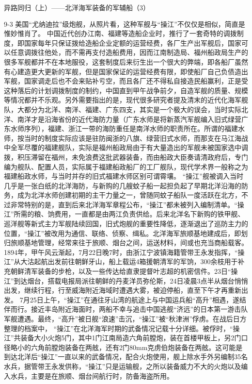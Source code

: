 \documentclass[12pt,UTF8]{ctexbook}
\begin{document}
异路同归（上）——北洋海军装备的军辅船（3）

9-3
美国“尤纳迪拉”级炮舰，从照片看，这种军舰与“操江”不仅仅是相似，简直是惟妙惟肖了。
中国近代创办江南、福建等造船企业时，推行了一套奇特的调拨制度，即国家每年只保证拨给造船企业定额的运营经费，各厂生产出军舰后，国家可以任意调拨往他处，而不需再支付造船费用，因而江南制造局、福州船政局生产的很多军舰都并不在本地服役，这套制度后来衍生出一个很大的弊端，即各船厂虽然有心建造更大更新的军舰，但是国家保证的运营经费有限，即使船厂自己负债造出军舰，国家调走后也不会来贴补亏空，而且各厂还不得私自接造民船赢利，正是受这种落后的计划调拨制度的制约，中国直到甲午战争前夕，自造军舰的质量、规模等情况都并不乐观。另外需要指出的是，现代很多研究者提及清末的近代化海军舰队，大都分为北洋、南洋、福建、广东四支，其实是一个极大的误会，当时实际北洋、南洋才是沿海省份的近代海防力量（广东水师是将新蒸汽军舰编入旧式绿营广东水师序列），福建、浙江一带的海防重任是南洋水师的职责所在。所谓的福建水师，按当时的制度实际应该是驻防闽浙的八旗、绿营旧式水师，而那支在马江海战中全军尽覆的福建舰队，实际是福州船政局由于有大量造出的军舰未被国家选中调拨，积压滞留在福州，未免浪费这批武器装备，而由船政大臣奏请清政府后，专门编为舰队、配置人员，实际属于福建船政船厂的工厂舰队，现代学术界一般称之为福建船政水师，与当时并存的旧式福建水师区别可谓霄壤。
“操江”舰被调入当时几乎是一张白纸的北洋海防，与新购的几艘蚊子船一起担负起了早期北洋沿海的防务，成为北洋水师创建初期的主干力量之一，曾随同蚊子船队一度活跃在北方，不过非常特别的是，直到后来北洋海军章程公布，“操江”都未被列入编制清单。“操江”所需的粮、饷费用，一直都是由两江负责供给。后来北洋名下新购的铁甲舰、巡洋舰等新式主力军舰陆续回国，旧式炮舰的重要性降低，逐渐退出了巡防主力的位置，“操江”被改用为通信、联络、侦察、缉私。北洋海军旅顺基地建成后，即划归旅顺基地管理，经常来往于旅顺、烟台之间，运送材料，间或也充当商船载客。
1894年，甲午风云渐起，7月22日晚7时，由浙江宁波镇海籍管带王永发指挥，“操江”从大沽起航出发前往朝鲜牙山，船上载运4箱援朝清军的军饷，300余枝用于补充朝鲜清军装备的步枪，以及一些传达给直隶提督叶志超的机密信件。23日“操江”到达烟台，搭载电报局派往朝鲜的丹麦洋员弥伦斯，24日凌晨3点半从烟台悄悄出发，继续行程，行至威海附近海域时遭遇大雾，被迫停船，直至下午才再重新出发。
7月25日上午，“操江”在通往牙山湾的航途上与中国运兵船“高升”相遇，遂结伴而行。接近丰岛附近海面时，两船不幸与追击中国逃舰“济远”的日本第一游击队军舰遭遇。最终，“高升”被日舰“浪速”击沉，“操江”被“秋津洲”俘虏。在战后日方整理的档案中， “操江”在北洋海军时期的武备情况记载十分详细。被俘时，“操江”共装备大小火炮5门，其中1门江南局造六角前膛炮，装在首楼甲板上，另2门口径略小的六角前膛炮装备在两舷，还有2门80mm克虏伯炮装备在两舷。这可能是到达北洋后“操江”一直以来的武备情况，配合火炮使用，舰上除水手外另编制35名水兵，据管带王永发供称，“操江”只是运输舰，之所以装备威力不大的火炮以及编入水兵，主要是在旅顺、烟台间航行时，防备海盗所用。
\end{document}
